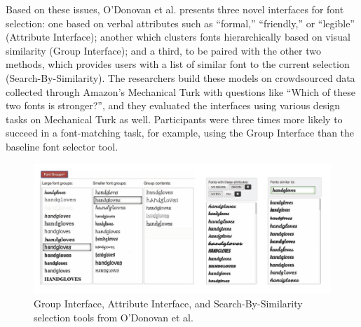 Based on these issues, O'Donovan et al. presents three novel interfaces for font selection: one based on verbal attributes such as ``formal,'' ``friendly,'' or ``legible'' (Attribute Interface); another which clusters fonts hierarchically based on visual similarity (Group Interface); and a third, to be paired with the other two methods, which provides users with a list of similar font to the current selection (Search-By-Similarity). The researchers build these models on crowdsourced data collected through Amazon's Mechanical Turk with questions like ``Which of these two fonts is stronger?'', and they evaluated the interfaces using various design tasks on Mechanical Turk as well. Participants were three times more likely to succeed in a font-matching task, for example, using the Group Interface than the baseline font selector tool.

\begin{figure}[h]
    \centering
    \includegraphics[width=1\textwidth]{images/odonovan-interfaces.png}
    \caption{Group Interface, Attribute Interface, and Search-By-Similarity selection tools from O'Donovan et al.}
    \label{fig:odonovan-interfaces}
\end{figure}